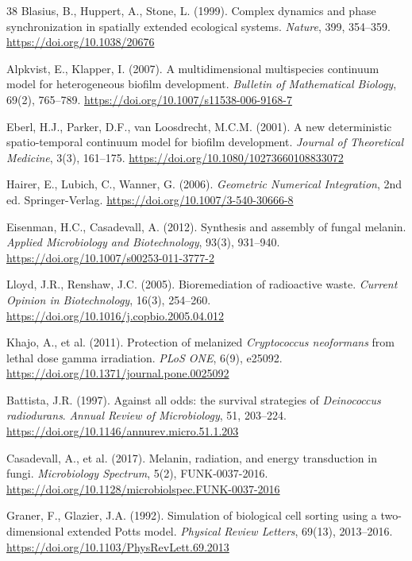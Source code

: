 \documentclass[11pt]{article}
\begin{document}
\begin{thebibliography}{38}
Blasius, B., Huppert, A., Stone, L. (1999).
Complex dynamics and phase synchronization in spatially extended ecological systems.
\textit{Nature}, 399, 354--359.
\url{https://doi.org/10.1038/20676}

Alpkvist, E., Klapper, I. (2007).
A multidimensional multispecies continuum model for heterogeneous biofilm development.
\textit{Bulletin of Mathematical Biology}, 69(2), 765--789.
\url{https://doi.org/10.1007/s11538-006-9168-7}

Eberl, H.J., Parker, D.F., van Loosdrecht, M.C.M. (2001).
A new deterministic spatio-temporal continuum model for biofilm development.
\textit{Journal of Theoretical Medicine}, 3(3), 161--175.
\url{https://doi.org/10.1080/10273660108833072}

Hairer, E., Lubich, C., Wanner, G. (2006).
\textit{Geometric Numerical Integration}, 2nd ed.
Springer-Verlag.
\url{https://doi.org/10.1007/3-540-30666-8}

Eisenman, H.C., Casadevall, A. (2012).
Synthesis and assembly of fungal melanin.
\textit{Applied Microbiology and Biotechnology}, 93(3), 931--940.
\url{https://doi.org/10.1007/s00253-011-3777-2}

Lloyd, J.R., Renshaw, J.C. (2005).
Bioremediation of radioactive waste.
\textit{Current Opinion in Biotechnology}, 16(3), 254--260.
\url{https://doi.org/10.1016/j.copbio.2005.04.012}

Khajo, A., et al. (2011).
Protection of melanized \textit{Cryptococcus neoformans} from lethal dose gamma irradiation.
\textit{PLoS ONE}, 6(9), e25092.
\url{https://doi.org/10.1371/journal.pone.0025092}

Battista, J.R. (1997).
Against all odds: the survival strategies of \textit{Deinococcus radiodurans}.
\textit{Annual Review of Microbiology}, 51, 203--224.
\url{https://doi.org/10.1146/annurev.micro.51.1.203}

Casadevall, A., et al. (2017).
Melanin, radiation, and energy transduction in fungi.
\textit{Microbiology Spectrum}, 5(2), FUNK-0037-2016.
\url{https://doi.org/10.1128/microbiolspec.FUNK-0037-2016}

Graner, F., Glazier, J.A. (1992).
Simulation of biological cell sorting using a two-dimensional extended Potts model.
\textit{Physical Review Letters}, 69(13), 2013--2016.
\url{https://doi.org/10.1103/PhysRevLett.69.2013}


\end{thebibliography}
\end{document}

